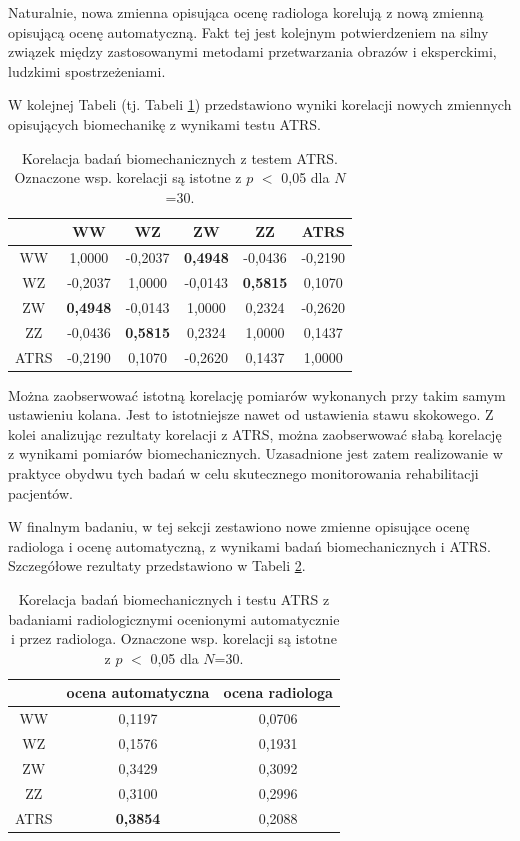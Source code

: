 Naturalnie, nowa zmienna opisująca ocenę radiologa korelują z nową zmienną opisującą ocenę automatyczną. Fakt tej jest kolejnym potwierdzeniem na silny związek między zastosowanymi metodami przetwarzania obrazów i eksperckimi, ludzkimi spostrzeżeniami. 

W kolejnej Tabeli (tj. Tabeli \ref{tab:bioVSatrs}) przedstawiono wyniki korelacji nowych zmiennych opisujących biomechanikę z wynikami testu ATRS. 

\begin{table}[h]
	\centering
	\setlength{\tabcolsep}{3pt}
	\setlength\extrarowheight{2pt}
	\caption{Korelacja badań biomechanicznych z testem ATRS. Oznaczone wsp. korelacji są istotne z $p$ $<$ 0,05 dla $N$=30.}
	\label{tab:bioVSatrs}
	\begin{tabular}{c|c|c|c|c|c}
		&WW&WZ&ZW&ZZ&ATRS \\
		\hline
		WW&1,0000&-0,2037&\textbf{0,4948}&-0,0436&-0,2190\\
		\hline
		WZ&-0,2037&1,0000&-0,0143&\textbf{0,5815}&0,1070\\
		\hline
		ZW&\textbf{0,4948}&-0,0143&1,0000&0,2324&-0,2620\\
		\hline
		ZZ&-0,0436&\textbf{0,5815}&0,2324&1,0000&0,1437\\
		\hline
		ATRS&-0,2190&0,1070&-0,2620&0,1437&1,0000\\
		\hline
		
	\end{tabular}
\end{table}

Można zaobserwować istotną korelację pomiarów wykonanych przy takim samym ustawieniu kolana. Jest to istotniejsze nawet od ustawienia stawu skokowego. Z kolei analizując rezultaty korelacji z ATRS, można zaobserwować słabą korelację z wynikami pomiarów biomechanicznych. Uzasadnione jest zatem realizowanie w praktyce obydwu tych badań w celu skutecznego monitorowania rehabilitacji pacjentów.

W finalnym badaniu, w tej sekcji zestawiono nowe zmienne opisujące ocenę radiologa i ocenę automatyczną, z wynikami badań biomechanicznych i ATRS. Szczegółowe rezultaty przedstawiono w Tabeli \ref{tab:bioATRSvspredGT}.

\begin{table}[h]
	\centering
	\setlength{\tabcolsep}{3pt}
	\setlength\extrarowheight{2pt}
	\caption{Korelacja badań biomechanicznych i testu ATRS z badaniami radiologicznymi ocenionymi automatycznie i przez radiologa. Oznaczone wsp. korelacji są istotne z $p$ $<$ 0,05 dla $N$=30.}
	\label{tab:bioATRSvspredGT}
	\begin{tabular}{c|c|c}
		&ocena automatyczna&ocena radiologa \\
		\hline
		WW&0,1197&0,0706\\
		\hline
		WZ&0,1576&0,1931\\
		\hline
		ZW&0,3429&0,3092\\
		\hline
		ZZ&0,3100&0,2996\\
		\hline
		ATRS&\textbf{0,3854}&0,2088\\
		\hline
	
	\end{tabular}
\end{table}

